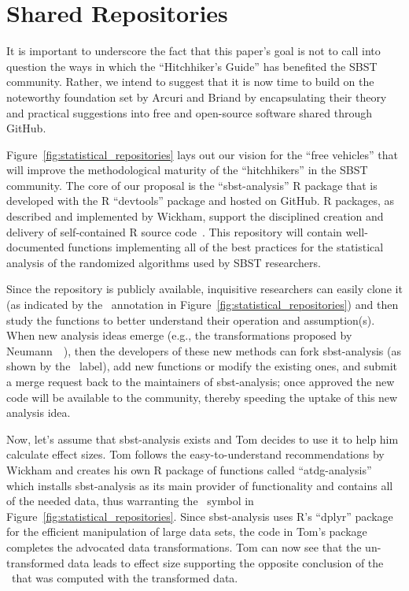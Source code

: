 
\vspace*{-.5em}

\section{Shared Repositories}
\label{sec:repositories}



It is important to underscore the fact that this paper's goal is not to call into question the ways in which the
``Hitchhiker's Guide'' has benefited the SBST community. Rather, we intend to suggest that it is now time to build on
the noteworthy foundation set by Arcuri and Briand by encapsulating their theory and practical suggestions into free and
open-source software shared through GitHub.

Figure~\ref{fig:statistical_repositories} lays out our vision for the ``free vehicles'' that will improve the
methodological maturity of the ``hitchhikers'' in the SBST community. The core of our proposal is the ``sbst-analysis''
R package that is developed with the R ``devtools'' package and hosted on GitHub. R packages, as described and
implemented by Wickham, support the disciplined creation and delivery of self-contained R source
code~\cite{Wickham2015}. This repository will contain well-documented functions implementing all of the best practices
for the statistical analysis of the randomized algorithms used by SBST researchers.

Since the repository is publicly available, inquisitive researchers can easily clone it (as indicated by the
\codecopygit~annotation in Figure~\ref{fig:statistical_repositories}) and then study the functions to better understand
their operation and assumption(s). When new analysis ideas emerge (e.g., the transformations proposed by
Neumann~\etal~\cite{Neumann2015}), then the developers of these new methods can fork sbst-analysis (as shown by the
\codeforkgit~label), add new functions or modify the existing ones, and submit a merge request back to the maintainers
of sbst-analysis; once approved the new code will be available to the community, thereby speeding the uptake of this new
analysis idea.

Now, let's assume that sbst-analysis exists and Tom decides to use it to help him calculate effect sizes. Tom follows
the easy-to-understand recommendations by Wickham and creates his own R package of functions called ``atdg-analysis''
which installs sbst-analysis as its main provider of functionality and contains all of the needed data, thus warranting
the \codedatagit~symbol in Figure~\ref{fig:statistical_repositories}. Since sbst-analysis uses R's ``dplyr'' package for
the efficient manipulation of large data sets, the code in Tom's package completes the advocated data transformations.
Tom can now see that the un-transformed data leads to effect size supporting the opposite conclusion of the
\atwelve~that was computed with the transformed data.

